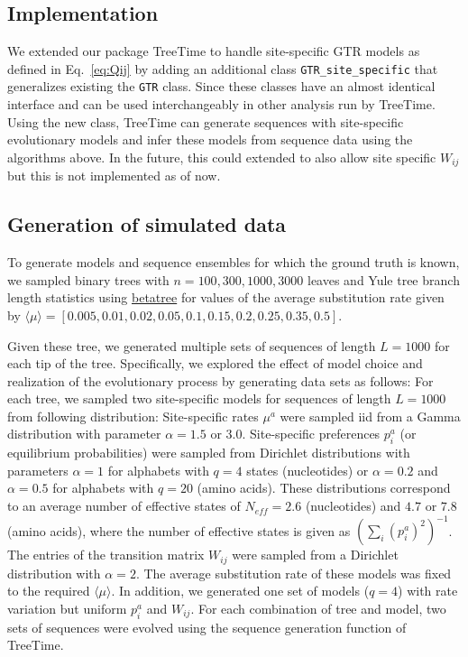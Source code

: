 \documentclass[aps,rmp,twocolumn,linenumbers]{revtex4-1}
\newcommand{\eqp}{p}
\begin{document}
\subsection*{Implementation}
We extended our package TreeTime \citep{sagulenko2017treetime} to handle site-specific GTR models as defined in Eq.~\ref{eq:Qij} by adding an additional class \texttt{GTR\_site\_specific} that generalizes existing the \texttt{GTR} class.
Since these classes have an almost identical interface and can be used interchangeably in other analysis run by TreeTime.
Using the new class, TreeTime can generate sequences with site-specific evolutionary models and infer these models from sequence data using the algorithms above.
In the future, this could extended to also allow site specific $W_{ij}$ but this is not implemented as of now.


\subsection*{Generation of simulated data}
To generate models and sequence ensembles for which the ground truth is known, we sampled binary trees with $n=100, 300, 1000, 3000$ leaves and Yule tree branch length statistics using \href{https://github.com/neherlab/betatree}{betatree} \citep{neher2013coalescence} for values of the average substitution rate given by $\langle \mu\rangle = [0.005, 0.01, 0.02, 0.05, 0.1, 0.15, 0.2, 0.25, 0.35, 0.5]$.

Given these tree, we generated multiple sets of sequences of length $L=1000$ for each tip of the tree.
Specifically, we explored the effect of model choice and realization of the evolutionary process by generating data sets as follows:
For each tree, we sampled two site-specific models for sequences of length $L=1000$ from following distribution:
Site-specific rates $\mu^a$ were sampled iid from a Gamma distribution with parameter $\alpha=1.5$ or $3.0$.
Site-specific preferences $\eqp_i^a$ (or equilibrium probabilities) were sampled from Dirichlet distributions with parameters $\alpha=1$ for alphabets with $q=4$ states (nucleotides) or $\alpha=0.2$ and $\alpha=0.5$ for alphabets with $q=20$ (amino acids).
These distributions correspond to an average number of effective states of $N_{eff} = 2.6$ (nucleotides) and $4.7$ or $7.8$ (amino acids), where the number of effective states is given as $\left(\sum_i (\eqp_i^a)^2\right)^{-1}$.
The entries of the transition matrix $W_{ij}$ were sampled from a Dirichlet distribution with $\alpha=2$.
The average substitution rate of these models was fixed to the required $\langle \mu\rangle$.
In addition, we generated one set of models ($q=4$) with rate variation but uniform $\eqp_i^a$ and $W_{ij}$.
For each combination of tree and model, two sets of sequences were evolved using the sequence generation function of TreeTime.
\end{document}
